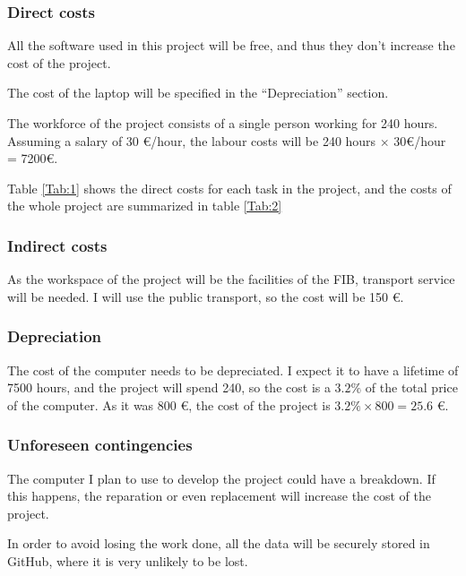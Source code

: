 \documentclass[a4paper]{article}
\begin{document}
            \subsubsection*{Direct costs}

            All the software used in this project will be free, and thus they don't increase the cost of the project.

            The cost of the laptop will be specified in the ``Depreciation'' section.

            The workforce of the project consists of a single person working for 240 hours. Assuming a salary of 30 €/hour, the labour costs will be 240 hours \(\times\) 30€/hour = 7200€.

            Table \ref{Tab:1} shows the direct costs for each task in the project, and the costs of the whole project are summarized in table \ref{Tab:2}

            \subsubsection*{Indirect costs}

            As the workspace of the project will be the facilities of the FIB, transport service will be needed. I will use the public transport, so the cost will be 150 €.

            \subsubsection*{Depreciation}

            The cost of the computer needs to be depreciated. I expect it to have a lifetime of 7500 hours, and the project will spend 240, so the cost is a $3.2 \%$ of the total price of the computer. As it was 800 €, the cost of the project is $3.2 \% \times 800 = 25.6$ €.

            \subsubsection*{Unforeseen contingencies}

            The computer I plan to use to develop the project could have a breakdown. If this happens, the reparation or even replacement will increase the cost of the project.

            In order to avoid losing the work done, all the data will be securely stored in GitHub, where it is very unlikely to be lost.
\end{document}
